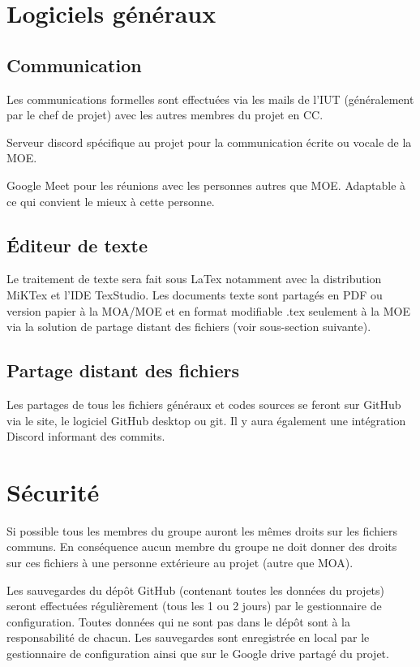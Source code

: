 \documentclass[11pt,a4paper,titlepage,openright]{report}
\begin{document}
    \section{Logiciels généraux}
        \subsection{Communication}
        \par Les communications formelles sont effectuées via les mails de l’IUT (généralement par le chef
        de projet) avec les autres membres du projet en CC.

        \par Serveur discord spécifique au projet pour la communication écrite ou vocale de la MOE.
        \par Google Meet pour les réunions avec les personnes autres que MOE. Adaptable à ce qui
        convient le mieux à cette personne.
        
        \subsection{Éditeur de texte}
        Le traitement de texte sera fait sous LaTex notamment avec la distribution MiKTex et l'IDE TexStudio. Les documents texte sont partagés en PDF ou version papier à la MOA/MOE  et en format modifiable .tex seulement à la MOE via la solution de partage distant des fichiers (voir sous-section suivante).
        
        \subsection{Partage distant des fichiers}
        Les partages de tous les fichiers généraux et codes sources se feront sur GitHub via le site, le logiciel GitHub desktop ou git. Il y aura également une intégration Discord informant des commits.
        
    \section{Sécurité}
    \par Si possible tous les membres du groupe auront les mêmes droits sur les fichiers communs.
    En conséquence aucun membre du groupe ne doit donner des droits sur ces fichiers à une
    personne extérieure au projet (autre que MOA).
    \par Les sauvegardes du dépôt GitHub (contenant toutes les données du projets) seront effectuées
    régulièrement (tous les 1 ou 2 jours) par le gestionnaire de configuration. Toutes données qui ne
    sont pas dans le dépôt sont à la responsabilité de chacun.
    Les sauvegardes sont enregistrée en local par le gestionnaire de configuration ainsi que sur le Google drive partagé du projet.



    \appendix
\end{document}
